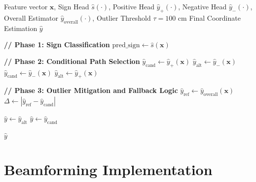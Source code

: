\begin{algorithm}[htbp]
\caption{Hybrid Decision Logic for Coordinate Estimation with Outlier Mitigation}
\label{alg:hybrid_decision_logic}
\begin{algorithmic}[1]
\Require Feature vector $\mathbf{x}$, Sign Head $\hat{s}(\cdot)$, Positive Head $\hat{y}_{+}(\cdot)$, Negative Head $\hat{y}_{-}(\cdot)$, Overall Estimator $\hat{y}_{\text{overall}}(\cdot)$, Outlier Threshold $\tau = 100\text{ cm}$
\Ensure Final Coordinate Estimation $\hat{y}$

\Statex \textbf{// Phase 1: Sign Classification}
\State $\text{pred\_sign} \gets \hat{s}(\mathbf{x})$ 

\Statex \textbf{// Phase 2: Conditional Path Selection}
 
    \State $\hat{y}_{\text{cand}} \gets \hat{y}_{+}(\mathbf{x})$ 
    \State $\hat{y}_{\text{alt}} \gets \hat{y}_{-}(\mathbf{x})$  
\Else {}
    \State $\hat{y}_{\text{cand}} \gets \hat{y}_{-}(\mathbf{x})$
    \State $\hat{y}_{\text{alt}} \gets \hat{y}_{+}(\mathbf{x})$
\EndIf

\Statex \textbf{// Phase 3: Outlier Mitigation and Fallback Logic}
\State $\hat{y}_{\text{ref}} \gets \hat{y}_{\text{overall}}(\mathbf{x})$ 
\State $\Delta \gets |\hat{y}_{\text{ref}} - \hat{y}_{\text{cand}}|$ 

\If{$\Delta > \tau$} 
    \State $\hat{y} \gets \hat{y}_{\text{alt}}$ 
\Else
    \State $\hat{y} \gets \hat{y}_{\text{cand}}$ 
\EndIf

\State \Return $\hat{y}$
\end{algorithmic}
\end{algorithm}


\section{Beamforming Implementation}


